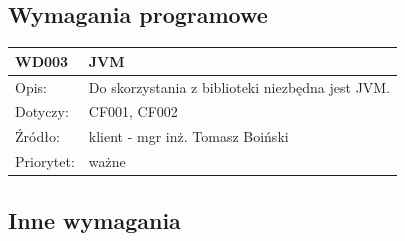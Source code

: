 \documentclass[a4paper,10pt]{article}
\begin{document}



\subsection{Wymagania programowe}


\begin{center}

\begin{tabular}{|m{3cm}|m{9cm}|} \hline

WD003 & JVM \\ \hline
Opis: & Do skorzystania z biblioteki niezbędna jest JVM.\\ \hline
Dotyczy: & CF001, CF002 \\ \hline
Źródło: & klient - mgr inż. Tomasz Boiński \\ \hline
Priorytet: & ważne \\ \hline

\end{tabular}
 
\end{center}

\subsection{Inne wymagania}
 
\end{document}
